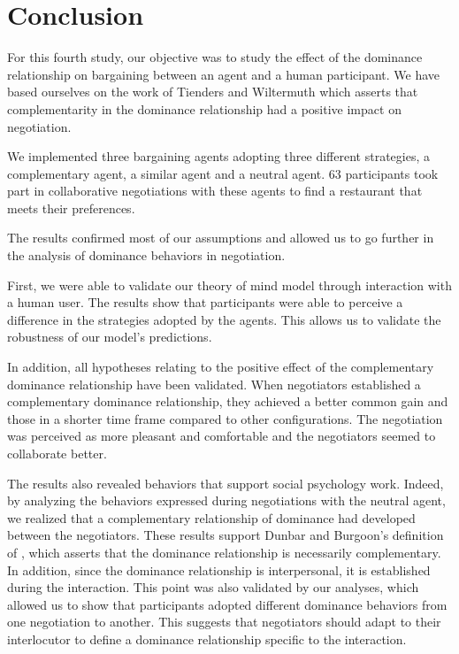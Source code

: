 \documentclass[10pt, a4paper, twocolumn]{article} %
\begin{document}
					
\section{Conclusion}

For this fourth study, our objective was to study the effect of the dominance relationship on bargaining between an agent and a human participant. We have based ourselves on the work of Tienders and Wiltermuth \cite{wiltermuth2009benefits,tiedens2003power} which asserts that complementarity in the dominance relationship had a positive impact on negotiation. 

We implemented three bargaining agents adopting three different strategies, a complementary agent, a similar agent and a neutral agent. 
63 participants took part in collaborative negotiations with these agents to find a restaurant that meets their preferences. 

The results confirmed most of our assumptions and allowed us to go further in the analysis of dominance behaviors in negotiation. 

First, we were able to validate our theory of mind model through interaction with a human user. 
The results show that participants were able to perceive a difference in the strategies adopted by the agents. This allows us to validate the robustness of our model's predictions. 

In addition, all hypotheses relating to the positive effect of the complementary dominance relationship have been validated. When negotiators established a complementary dominance relationship, they achieved a better common gain and those in a shorter time frame compared to other configurations. The negotiation was perceived as more pleasant and comfortable and the negotiators seemed to collaborate better. 

The results also revealed behaviors that support social psychology work. Indeed, by analyzing the behaviors expressed during negotiations with the neutral agent, we realized that a complementary relationship of dominance had developed between the negotiators. These results support Dunbar and Burgoon's definition of \cite{dunbar2005perceptions}, which asserts that the dominance relationship is necessarily complementary. In addition, since the dominance relationship is interpersonal, it is established during the interaction. This point was also validated by our analyses, which allowed us to show that participants adopted different dominance behaviors from one negotiation to another. This suggests that negotiators should adapt to their interlocutor to define a dominance relationship specific to the interaction. 			

\printbibliography[title={Bibliography}] %

\end{document}
